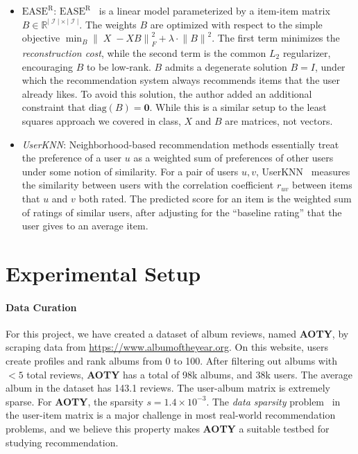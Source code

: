 \documentclass{article}
\newcommand{\aoty}{{\bf AOTY}\xspace}
\DeclareMathOperator{\X}{\mathit{X}}
\DeclareMathOperator{\I}{\mathcal{I}}
\newcommand{\card}[1]{\ensuremath{\lvert {#1} \rvert}}
\newcommand{\easer}{$\text{EASE}^\text{R}$}
\newcommand{\userknn}{UserKNN\xspace}
\newcommand{\norm}[1]{\ensuremath{\lVert #1 \rVert}}
\begin{document}
\begin{itemize}
	\item {\em \easer}:
	      \easer~\citep{steckEmbarrassinglyShallowAutoencoders2019}
	      is a linear model parameterized by a item-item matrix $B \in
		      \mathbb{R}^{\card{\I} \times \card{\I}}$.
	      The weights $B$ are optimized with respect to the simple objective $\min_B
		       \norm{\X - X B}_F^2 + \lambda \cdot \norm{B}^2$.
	      The first term minimizes the {\em reconstruction cost}, while the second term
	       is the common $L_2$ regularizer, encouraging $B$ to be low-rank.
	      $B$ admits a degenerate solution $B = I$, under which the
	      recommendation
	      system always recommends items that the user already likes.
	      To avoid this solution, the author added an additional constraint that
	      $\mathrm{diag}(B) = \mathbf{0}$. While this is a similar setup to the 
        least squares approach we covered in class, $X$ and $B$ are matrices, 
        not vectors. 

	      \item{\em \userknn}: Neighborhood-based recommendation methods
	      essentially
	      treat the preference of a user $u$ as a weighted sum of
	      preferences of other
	      users under some notion of similarity.
	      For a pair of users $u, v$,
	       \userknn~\citep{resnickGroupLensOpenArchitecture1994} measures the similarity
	       between users with the correlation coefficient $r_{uv}$ between items that $u$
	       and $v$ both rated.
	      The predicted score for an item is the weighted sum of ratings of similar
	       users, after adjusting for the ``baseline rating'' that the user gives to an
	       average item.
\end{itemize}

\section{Experimental Setup}
\paragraph*{Data Curation}
For this project, we have created a dataset of album reviews, named \aoty, by
 scraping data from \url{https://www.albumoftheyear.org}.
On this website, users create profiles and rank albums from 0 to 100.
After filtering out albums with $<5$ total reviews, \aoty has a total of 98k
 albums, and 38k users.
The average album in the dataset has 143.1 reviews.
The user-album matrix is extremely sparse.
For \aoty, the sparsity $s = 1.4 \times 10^{-3}$.
The {\em data sparsity} problem~\citep{suSurveyCollaborativeFiltering2009} in
 the user-item matrix is a major challenge in most real-world recommendation
 problems, and we believe this property makes \aoty a suitable testbed for
 studying recommendation.
\end{document}
